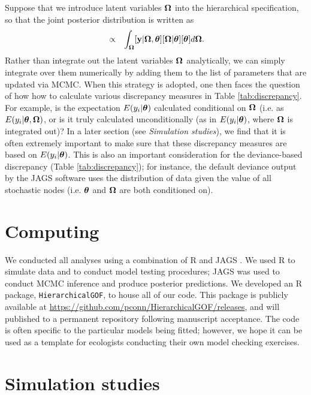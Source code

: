 \documentclass[12pt,english]{article}
\begin{document}
\begin{spacing}{1.9}
Suppose that we introduce latent variables $\boldsymbol{\Omega}$ into the hierarchical specification, so that the joint posterior distribution is written as
\begin{eqnarray*}
  [\bftheta | \bfy] & \propto & \int_{\bfOmega} [\bfy | \bfOmega, \bftheta][\bfOmega |\bftheta][\bftheta] d\bfOmega.
\end{eqnarray*}
Rather than integrate out the latent variables $\boldsymbol{\Omega}$ analytically, we can simply integrate over them numerically by adding them to the list of parameters that are updated via MCMC.  When this strategy is adopted, one then faces the question of how how to calculate various discrepancy measures in Table \ref{tab:discrepancy}.  For example, is the expectation $E(y_i|\boldsymbol{\theta})$ calculated conditional on $\boldsymbol{\Omega}$ (i.e. as $E(y_i|\boldsymbol{\theta},\boldsymbol{\Omega})$, or is it truly calculated
unconditionally (as in $E(y_i|\boldsymbol{\theta})$, where $\boldsymbol{\Omega}$ is integrated out)?  In a later section (see \textit{Simulation studies}), we find that it is often extremely important to make sure that these discrepancy measures are based on $E(y_i|\boldsymbol{\theta})$.  This is also an important consideration for the deviance-based discrepancy (Table \ref{tab:discrepancy}); for instance, the default deviance output by the JAGS software \cite{Plummer2003} uses the distribution of data given the value of all stochastic nodes (i.e. $\boldsymbol{\theta}$ and $\boldsymbol{\Omega}$ are both conditioned on).

\section{Computing}

We conducted all analyses using a combination of R \citep{RTeam2015} and JAGS \citep{Plummer2003}.  We used R to simulate data and to conduct model testing procedures; JAGS was used to conduct MCMC inference and produce posterior predictions. We developed an R package, \texttt{HierarchicalGOF}, to house all of our code.  This package is publicly available at \url{https://github.com/pconn/HierarchicalGOF/releases}, and will published to a permanent repository following manuscript acceptance. The code is often specific to the particular models being fitted; however, we hope it can be used as a template for ecologists conducting their own model checking exercises.

\section{Simulation studies}


\end{spacing}
\end{document}
